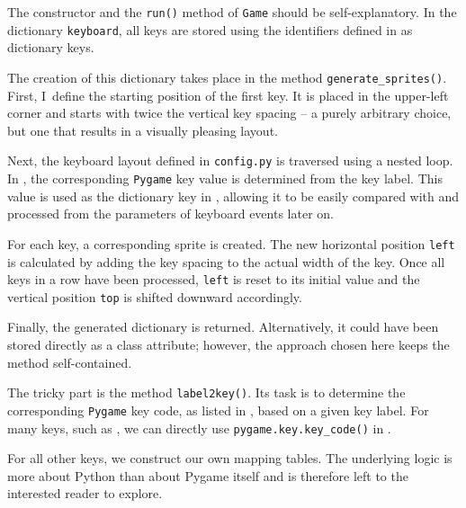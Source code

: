 
The constructor and the \texttt{run()} method of \texttt{Game} should be self-explanatory. In the dictionary \texttt{keyboard}, all keys are stored using the identifiers defined in  as dictionary keys.


The creation of this dictionary takes place in the method \texttt{generate\_sprites()}. First, I~define the starting position of the first key. It is placed in the upper-left corner and starts with twice the vertical key spacing -- a purely arbitrary choice, but one that results in a visually pleasing layout.

Next, the keyboard layout defined in \texttt{config.py} is traversed using a nested loop. In , the corresponding \texttt{Pygame} key value is determined from the key label. This value is used as the dictionary key in , allowing it to be easily compared with and processed from the parameters of keyboard events later on.

For each key, a corresponding sprite is created. The new horizontal position \texttt{left} is calculated by adding the key spacing to the actual width of the key. Once all keys in a row have been processed, \texttt{left} is reset to its initial value and the vertical position \texttt{top} is shifted downward accordingly.

Finally, the generated dictionary is returned. Alternatively, it could have been stored directly as a class attribute; however, the approach chosen here keeps the method self-contained.


The tricky part is the method \texttt{label2key()}. Its task is to determine the corresponding \texttt{Pygame} key code, as listed in , based on a given key label. For many keys, such as , we can directly use \texttt{pygame.key.key\_code()} in .

For all other keys, we construct our own mapping tables. The underlying logic is more about Python than about Pygame itself and is therefore left to the interested reader to explore. 
 

